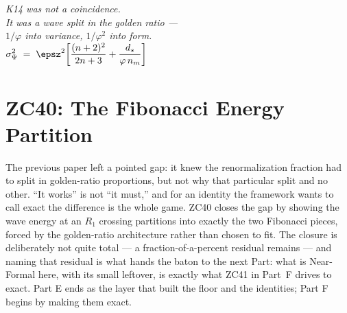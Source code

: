 \documentclass[12pt, a4paper]{article}
\begin{document}
\bigskip
\begin{center}
\textit{%
  K14 was not a coincidence.\\
  It was a wave split in the golden ratio ---\\
  $1/\varphi$ into variance, $1/\varphi^2$ into form.\\[0.5em]
  $\displaystyle
  \sigma_\Psi^2 \;=\; \epsz^2\!\left[\frac{(n+2)^2}{2n+3}
  + \frac{d_s}{\varphi\,n_m}\right]$
}
\end{center}

\section{ZC40: The Fibonacci Energy Partition}
\label{sec:zc40-fibonacci}

The previous paper left a pointed gap: it knew the renormalization fraction had
to split in golden-ratio proportions, but not why that particular split and no
other. ``It works'' is not ``it must,'' and for an identity the framework wants
to call exact the difference is the whole game. ZC40 closes the gap by showing
the wave energy at an $R_1$ crossing partitions into exactly the two Fibonacci
pieces, forced by the golden-ratio architecture rather than chosen to fit. The
closure is deliberately not quite total --- a fraction-of-a-percent residual
remains --- and naming that residual is what hands the baton to the next Part:
what is Near-Formal here, with its small leftover, is exactly what ZC41 in Part~F
drives to exact. Part E ends as the layer that built the floor and the
identities; Part F begins by making them exact.



\sloppy
\end{document}
